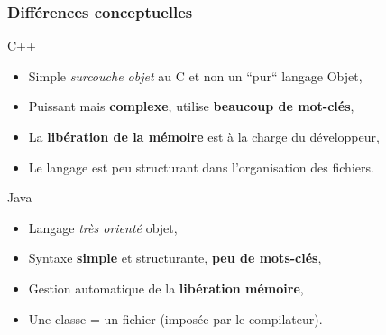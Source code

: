 \documentclass[handout]{beamer}
\begin{document}
\begin{frame}
	\frametitle{Différences conceptuelles}
	\begin{block}{C++}
		\begin{itemize}
			\item Simple \textit{surcouche objet} au C et non un ``pur`` langage Objet,
			\item Puissant mais \textbf{complexe}, utilise \textbf{beaucoup de mot-clés},	
			\item La \textbf{libération de la mémoire} est à la charge du développeur,
			\item Le langage est peu structurant dans l'organisation des fichiers.
		\end{itemize}
	\end{block}	
	\begin{block}{Java}
		\begin{itemize}
			\item Langage \textit{très orienté} objet,
			\item Syntaxe \textbf{simple} et structurante, \textbf{peu de mots-clés},
			\item Gestion automatique de la \textbf{libération mémoire},
			\item Une classe = un fichier (imposée par le compilateur).
		\end{itemize}
	\end{block}

\end{frame}
\end{document}

